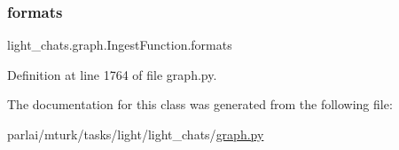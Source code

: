 \subsubsection{\texorpdfstring{formats}{formats}}
{\footnotesize\ttfamily light\+\_\+chats.\+graph.\+Ingest\+Function.\+formats}



Definition at line 1764 of file graph.\+py.



The documentation for this class was generated from the following file\+:\begin{DoxyCompactItemize}
\item 
parlai/mturk/tasks/light/light\+\_\+chats/\hyperlink{parlai_2mturk_2tasks_2light_2light__chats_2graph_8py}{graph.\+py}\end{DoxyCompactItemize}
